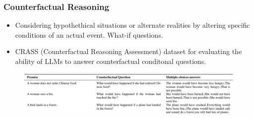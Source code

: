 \documentclass{beamer}
\begin{document}

\begin{frame}
	\frametitle{Counterfactual Reasoning}
	\begin{itemize}
		\item Considering hypothethical situations or alternate realities by altering specific conditions of an actual event. What-if questions.
		\item CRASS (Counterfactual Reasoning Assessment) dataset for evaluating the ability of LLMs to answer counterfactual conditonal questions.
	\end{itemize}
	\begin{figure}
		\centering
		\includegraphics[scale=0.22]{imgs/table8.png}
	\end{figure}
\end{frame}
\end{document}
